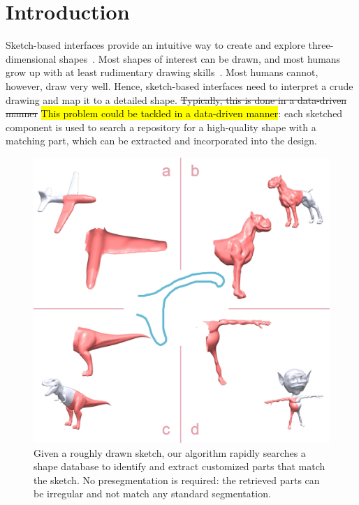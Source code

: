 \section{Introduction}

Sketch-based interfaces provide an intuitive way to create and explore three-dimensional shapes~\cite{sketchbasedmodelingsurveycg2009}. Most shapes of interest can be drawn, and most humans grow up with at least rudimentary drawing skills~\cite{DeckerChildren1988}. Most humans cannot, however, draw very well. Hence, sketch-based interfaces need to interpret a crude drawing and map it to a detailed shape. \st{Typically, this is done in a data-driven manner} \hl{This problem could be tackled in a data-driven manner}: each sketched component is used to search a repository for a high-quality shape with a matching part, which can be extracted and incorporated into the design.

\begin{figure}[h!]
\centering
\includegraphics[width=0.9\linewidth]{./Material/TeaserSGP.pdf}
\caption{Given a roughly drawn sketch, our algorithm rapidly searches a shape database to identify and extract customized parts that match the sketch. No presegmentation is required: the retrieved parts can be irregular and not match any standard segmentation.}
\label{fig:HeadPic}
\end{figure}

